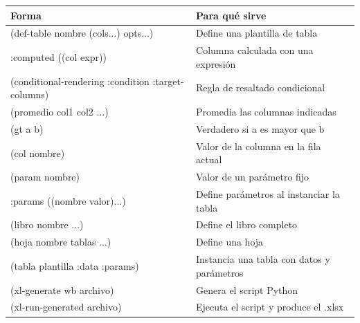 \documentclass[12pt,a4paper]{report}
\begin{document}
\begin{center}
\begin{tabular}{>{\ttfamily}p{5cm}p{8cm}}
\toprule
\textbf{Forma} & \textbf{Para qué sirve} \\
\midrule
(def-table nombre (cols...) opts...) & Define una plantilla de tabla \\
:computed ((col expr)) & Columna calculada con una expresión \\
(conditional-rendering :condition :target-columns) & Regla de resaltado condicional \\
(promedio col1 col2 ...) & Promedia las columnas indicadas \\
(gt a b) & Verdadero si a es mayor que b \\
(col nombre) & Valor de la columna en la fila actual \\
(param nombre) & Valor de un parámetro fijo \\
:params ((nombre valor)...) & Define parámetros al instanciar la tabla \\
(libro nombre ...) & Define el libro completo \\
(hoja nombre tablas ...) & Define una hoja \\
(tabla plantilla :data :params) & Instancia una tabla con datos y parámetros \\
(xl-generate wb archivo) & Genera el script Python \\
(xl-run-generated archivo) & Ejecuta el script y produce el .xlsx \\
\bottomrule
\end{tabular}
\end{center}
\end{document}
